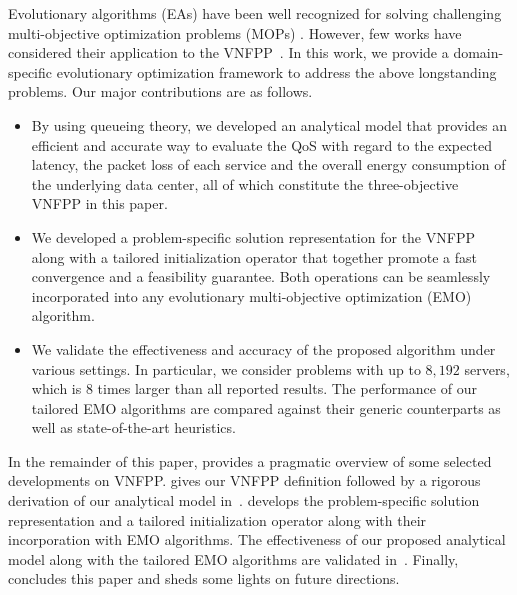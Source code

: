 Evolutionary algorithms (EAs) have been well recognized for solving challenging multi-objective optimization problems (MOPs) \cite{WangJ20,ZhouL17,WangWZ19,LiuLJ14}. However, few works have considered their application to the VNFPP~\cite{CaoZACHS16,RankothgeLRL17,LangeGZTJ17}. In this work, we provide a domain-specific evolutionary optimization framework to address the above longstanding problems. Our major contributions are as follows.
\begin{itemize}
    \item By using queueing theory, we developed an analytical model that provides an efficient and accurate way to evaluate the QoS with regard to the expected latency, the packet loss of each service and the overall energy consumption of the underlying data center, all of which constitute the three-objective VNFPP in this paper.
    \item We developed a problem-specific solution representation for the VNFPP along with a tailored initialization operator that together promote a fast convergence and a feasibility guarantee. Both operations can be seamlessly incorporated into any evolutionary multi-objective optimization (EMO) algorithm.
    \item We validate the effectiveness and accuracy of the proposed algorithm under various settings. In particular, we consider problems with up to $8,192$ servers, which is $8$ times larger than all reported results. The performance of our tailored EMO algorithms are compared against their generic counterparts as well as state-of-the-art heuristics.
\end{itemize}

In the remainder of this paper,  provides a pragmatic overview of some selected developments on VNFPP.  gives our VNFPP definition followed by a rigorous derivation of our analytical model in~.  develops the problem-specific solution representation and a tailored initialization operator along with their incorporation with EMO algorithms. The effectiveness of our proposed analytical model along with the tailored EMO algorithms are validated in~. Finally,  concludes this paper and sheds some lights on future directions.
